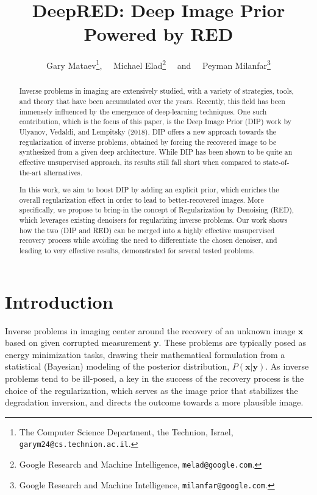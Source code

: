 \documentclass[12pt]{article}
\title{DeepRED: Deep Image Prior Powered by RED}
\author{Gary Mataev\thanks{The Computer Science Department, the Technion, Israel, \texttt{garym24@cs.technion.ac.il}.}, ~~Michael Elad\thanks{Google Research and Machine Intelligence, \texttt{melad@google.com}.}  ~~and ~~Peyman Milanfar\thanks{Google Research and Machine Intelligence, \texttt{milanfar@google.com}.}}
\def\x{{\mathbf x}}
\def\y{{\mathbf y}}
\begin{document}
\maketitle

\begin{abstract}
Inverse problems in imaging are extensively studied, with a variety of strategies, tools, and theory that have been accumulated over the years. Recently, this field has been immensely influenced by the emergence of deep-learning techniques. One such contribution, which is the focus of this paper, is the Deep Image Prior (DIP) work by Ulyanov, Vedaldi, and Lempitsky (2018). DIP offers a new approach towards the regularization of inverse problems, obtained by forcing the recovered image to be synthesized from a given  deep architecture. While DIP has been shown to be quite an effective unsupervised approach, its results still fall short when compared to state-of-the-art alternatives.

In this work, we aim to boost DIP by adding an explicit prior, which enriches the overall regularization effect in order to lead to better-recovered images. More specifically, we propose to bring-in the concept of Regularization by Denoising (RED), which leverages existing denoisers for regularizing inverse problems. Our work shows how the two (DIP and RED) can be merged into a highly effective unsupervised recovery process while avoiding the need to differentiate the chosen denoiser, and leading to very effective results, demonstrated for several tested problems.

\end{abstract}
\vspace{0.5in}


\section{Introduction}
\label{sec:Intro}

Inverse problems in imaging center around the recovery of an unknown image $\x$ based on given corrupted measurement $\y$. These problems are typically posed as energy minimization tasks,  drawing their mathematical formulation from a statistical (Bayesian) modeling of the posterior distribution, $P(\x|\y)$. As inverse problems tend to be ill-posed, a key in the success of the recovery process is the choice of the regularization, which serves as the image prior that stabilizes the degradation inversion, and directs the outcome towards a more plausible image.
\end{document}
